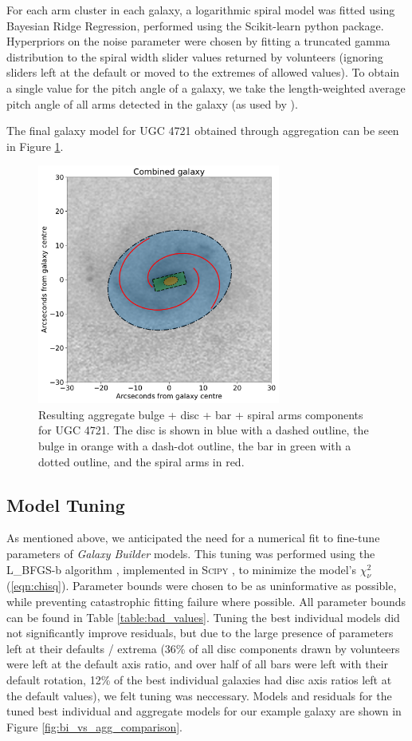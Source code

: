 \documentclass[../main.tex]{subfiles}
\begin{document}
For each arm cluster in each galaxy, a logarithmic spiral model was fitted using Bayesian Ridge Regression, performed using the Scikit-learn python package. Hyperpriors on the noise parameter were chosen by fitting a truncated gamma distribution \citep{2014arXiv1401.0287Z} to the spiral width slider values returned by volunteers (ignoring sliders left at the default or moved to the extremes of allowed values). To obtain a single value for the pitch angle of a galaxy, we take the length-weighted average pitch angle of all arms detected in the galaxy (as used by \citealt{Davis2014:1402.1910v1}).

The final galaxy model for UGC 4721 obtained through aggregation can be seen in Figure \ref{fig:aggregate_model}.

\begin{figure}
  \includegraphics[width=8cm]{images__method/aggregate_model.pdf}
  \caption{Resulting aggregate bulge + disc + bar + spiral arms components for UGC 4721. The disc is shown in blue with a dashed outline, the bulge in orange with a dash-dot outline, the bar in green with a dotted outline, and the spiral arms in red.}
  \label{fig:aggregate_model}
\end{figure}

\subsection{Model Tuning}

As mentioned above, we anticipated the need for a numerical fit to fine-tune parameters of \textit{Galaxy Builder} models. This tuning was performed using the L\_BFGS-b algorithm \citep{doi:10.1137/0916069}, implemented in \textsc{Scipy} \citep{scipy-paper}, to minimize the model's $\chi_\nu^2$ (\ref{eqn:chisq}). Parameter bounds were chosen to be as uninformative as possible, while preventing catastrophic fitting failure where possible. All parameter bounds can be found in Table \ref{table:bad_values}. Tuning the best individual models did not significantly improve residuals, but due to the large presence of parameters left at their defaults / extrema (36\% of all disc components drawn by volunteers were left at the default axis ratio, and over half of all bars were left with their default rotation, 12\% of the best individual galaxies had disc axis ratios left at the default values), we felt tuning was neccessary. Models and residuals for the tuned best individual and aggregate models for our example galaxy are shown in Figure \ref{fig:bi_vs_agg_comparison}.
\end{document}
